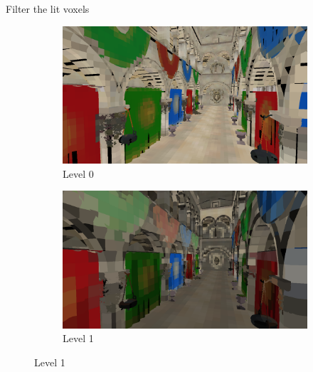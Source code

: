 \documentclass[10pt]{beamer}
\begin{document}
\begin{frame}{Filter the lit voxels}
  \begin{figure}
    \centering
    \begin{subfigure}[b]{0.475\textwidth}
        \centering
        \includegraphics[width=\textwidth]{mipmap0.png}
        \caption*{Level 0}
    \end{subfigure}
    \hfill
    \begin{subfigure}[b]{0.475\textwidth}
        \centering
        \includegraphics[width=\textwidth]{mipmap1.png}
        \caption*{Level 1}
    \end{subfigure}


\end{figure}
\end{frame}
\end{document}
